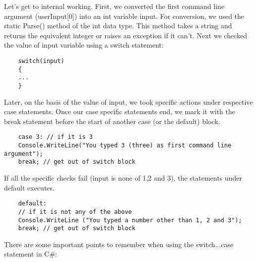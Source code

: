 Let’s get to internal working. First, we converted the first command line argument (userInput[0]) into an int
variable input. For conversion, we used the static Parse() method of the int data type. This method takes a string
and returns the equivalent integer or raises an exception if it can’t. Next we checked the value of input variable
using a switch statement:

\begin{lstlisting}   
    switch(input)
    {
    ...
    }    
\end{lstlisting}

Later, on the basis of the value of input, we took specific actions under respective case statements. Once our case
specific statements end, we mark it with the break statement before the start of another case (or the default) block.

\begin{lstlisting}
    case 3: // if it is 3
    Console.WriteLine("You typed 3 (three) as first command line argument");
    break; // get out of switch block        
\end{lstlisting}

If all the specific checks fail (input is none of 1,2 and 3), the statements under default executes.

\begin{lstlisting}
    default:
    // if it is not any of the above
    Console.WriteLine ("You typed a number other than 1, 2 and 3");
    break; // get out of switch block        
\end{lstlisting}

There are some important points to remember when using the switch...case statement in C\#:

